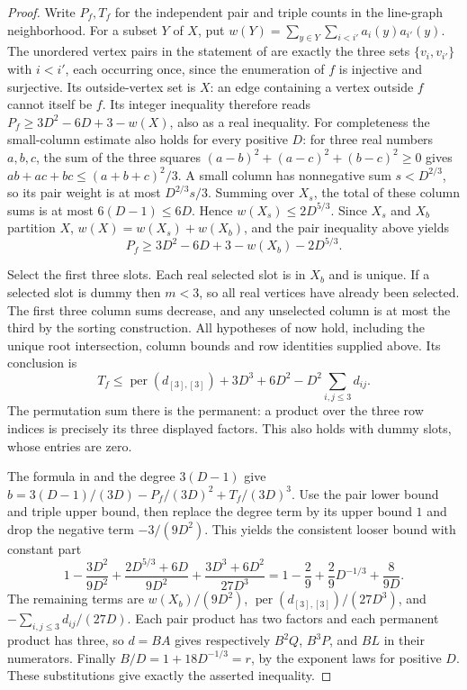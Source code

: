 \begin{proof}
Write $P_f,T_f$ for the independent pair and triple counts in the
line-graph neighborhood. For a subset $Y$ of $X$, put
$w(Y)=\sum_{y\in Y}\sum_{i<i'}a_i(y)a_{i'}(y)$.
The unordered vertex pairs in the statement of
 are exactly the three sets
$\{v_i,v_{i'}\}$ with $i<i'$, each occurring once, since the enumeration
of $f$ is injective and surjective. Its outside-vertex set is $X$: an
edge containing a vertex outside $f$ cannot itself be $f$.
Its integer inequality therefore reads
$P_f\ge3D^2-6D+3-w(X)$, also as a real inequality.
For completeness the small-column estimate also holds for every positive
$D$: for three real numbers $a,b,c$, the sum of the three squares
$(a-b)^2+(a-c)^2+(b-c)^2\ge0$ gives
$ab+ac+bc\le(a+b+c)^2/3$. A small column has nonnegative sum
$s<D^{2/3}$, so its pair weight is at most $D^{2/3}s/3$.
Summing over $X_s$, the total of these column sums is at most
$6(D-1)\le6D$. Hence $w(X_s)\le2D^{5/3}$.
Since $X_s$ and $X_b$ partition $X$, $w(X)=w(X_s)+w(X_b)$, and the
pair inequality above yields
\[
P_f\ge3D^2-6D+3-w(X_b)-2D^{5/3}.
\]

Select the first three slots. Each real selected slot is in $X_b$ and is
unique. If a selected slot is dummy then $m<3$, so all real vertices have
already been selected. The first three column sums decrease, and any
unselected column is at most the third by the sorting construction.
All hypotheses of  now hold,
including the unique root intersection, column bounds and row identities
supplied above. Its conclusion is
\[
T_f\le\operatorname{per}(d_{[3],[3]})+3D^3+6D^2
       -D^2\sum_{i,j\le3}d_{ij}.
\]
The permutation sum there is the permanent: a product over the three
row indices is precisely its three displayed factors. This also holds
with dummy slots, whose entries are zero.

The formula in  and the degree $3(D-1)$ give
$b=3(D-1)/(3D)-P_f/(3D)^2+T_f/(3D)^3$.
Use the pair lower bound and triple upper bound, then replace the degree
term by its upper bound $1$ and drop the negative term $-3/(9D^2)$.
This yields the consistent looser bound with constant part
\[
1-\frac{3D^2}{9D^2}
 +\frac{2D^{5/3}+6D}{9D^2}
 +\frac{3D^3+6D^2}{27D^3}
=1-\frac29+\frac29D^{-1/3}+\frac8{9D}.
\]
The remaining terms are $w(X_b)/(9D^2)$,
$\operatorname{per}(d_{[3],[3]})/(27D^3)$, and
$-\sum_{i,j\le3}d_{ij}/(27D)$. Each pair product has two factors and
each permanent product has three, so $d=BA$ gives respectively
$B^2Q$, $B^3P$, and $BL$ in their numerators. Finally
$B/D=1+18D^{-1/3}=r$, by the exponent laws for positive $D$.
These substitutions give exactly the asserted inequality.
\end{proof}
